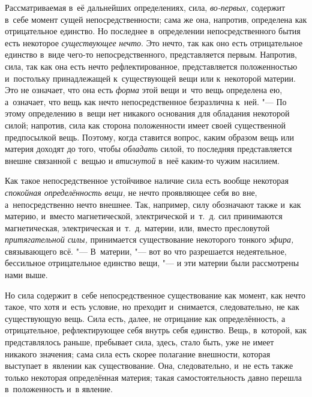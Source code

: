 
Рассматриваемая в~её дальнейших определениях,
сила, {\em во-первых,} содержит в~себе момент сущей
непосредственности; сама же она, напротив, определена как отрицательное
единство. Но последнее в~определении непосредственного бытия есть некоторое
{\em существующее} {\em нечто}. Это
нечто, так как оно есть отрицательное единство в~виде чего-то
непосредственного, представляется первым. Напротив, сила, так как она есть
нечто рефлектированное, представляется положенностью и~постольку
принадлежащей к~существующей вещи или к~некоторой материи. Это не означает,
что она есть {\em форма} этой вещи и~что вещь
определена ею, а~означает, что вещь как нечто непосредственное безразлична
к~ней. "--- По этому определению в~вещи нет никакого основания для обладания
некоторой силой; напротив, сила как сторона положенности имеет своей
существенной предпосылкой вещь. Поэтому, когда ставится вопрос, каким
образом вещь или материя доходят до того, чтобы
{\em обладать} силой, то последняя представляется
внешне связанной с~вещью и {\em втиснутой} в~неё
каким-то чужим насилием.

Как такое непосредственное устойчивое наличие сила есть вообще некоторая
{\em спокойная определённость вещи,} не нечто
проявляющее себя во вне, а~непосредственно нечто внешнее. Так, например,
силу обозначают также и~как материю, и~вместо магнетической, электрической
и~т.~д. сил принимаются магнетическая, электрическая и~т.~д. материи, или,
вместо пресловутой {\em притягательной силы,}
принимается существование некоторого тонкого
{\em эфира,} связывающего всё. "--- В~материи, "--- вот во
что разрешается недеятельное, бессильное отрицательное единство вещи, "--- и
эти материи были рассмотрены нами выше.

Но сила содержит в~себе непосредственное существование как момент, как нечто
такое, что хотя и~есть условие, но преходит и~снимается, следовательно, не
как существующую вещь. Сила есть, далее, не отрицание как определённость, а
отрицательное, рефлектирующее себя внутрь себя единство. Вещь, в~которой,
как представлялось раньше, пребывает сила, здесь, стало быть, уже не имеет
никакого значения; сама сила есть скорее полагание внешности, которая
выступает в~явлении как существование. Она, следовательно, и~не есть также
только некоторая определённая материя; такая самостоятельность давно
перешла в~положенность и~в явление.

